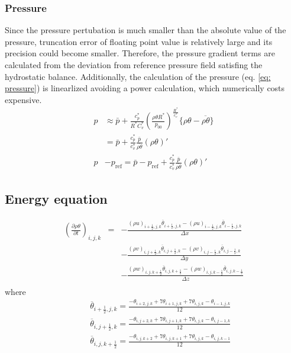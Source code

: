 \subsubsection{Pressure}
Since the pressure pertubation is much smaller than the absolute value of the pressure,
truncation error of floating point value is relatively large and its precision could become smaller.
Therefore, the pressure gradient terms are calculated from the deviation from reference pressure field satisfing the hydrostatic balance.
Additionally, the calculation of the pressure (eq. \ref{eq: pressure}) is linearlized avoiding a power calculation, which numerically costs expensive.
\begin{align}
  p
  &\approx \bar{p} + \frac{c_p^*}{R^* C_v^*}\left(\frac{\rho \theta R^*}{p_{00}}\right)^{\frac{R^*}{c_{v}^*}}  \{\rho \theta - \overline{\rho \theta}\} \nonumber \\
  &= \bar{p} + \frac{c_p^*}{c_v^*} \frac{\bar{p}}{\overline{\rho \theta}} (\rho \theta)' \\
  p &- p_\mathrm{ref}
  = \bar{p} - p_\mathrm{ref}
  + \frac{c_p^*}{c_v^*} \frac{\bar{p}}{\overline{\rho \theta}} (\rho \theta)'
\end{align}


\subsection{Energy equation}

\begin{eqnarray}
\left(\frac{\partial \rho \theta}{\partial t}\right)_{i,j,k}
&=& - \frac{(\rho u)_{i+\frac{1}{2},j,k} \overline{\theta}_{i+\frac{1}{2},j,k}
           -(\rho u)_{i-\frac{1}{2},j,k} \overline{\theta}_{i-\frac{1}{2},j,k}}
     {\Delta x}\nonumber\\
& &  - \frac{(\rho v)_{i,j+\frac{1}{2},k} \overline{\theta}_{i,j+\frac{1}{2},k}
           -(\rho v)_{i,j-\frac{1}{2},k} \overline{\theta}_{i,j-\frac{1}{2},k}}
     {\Delta y}\nonumber\\
& &  - \frac{(\rho w)_{i,j,k+\frac{1}{2}} \overline{\theta}_{i,j,k+\frac{1}{2}}
           -(\rho w)_{i,j,k-\frac{1}{2}} \overline{\theta}_{i,j,k-\frac{1}{2}}}
     {\Delta z}\nonumber\\
\end{eqnarray}
where
\begin{eqnarray}
&& \overline{\theta}_{i+\frac{1}{2},j,k} =
\frac{-\theta_{i+2,j,k}+7\theta_{i+1,j,k}+7\theta_{i,j,k}-\theta_{i-1,j,k}}{12}\\
&& \overline{\theta}_{i,j+\frac{1}{2},k} =
\frac{-\theta_{i,j+2,k}+7\theta_{i,j+1,k}+7\theta_{i,j,k}-\theta_{i,j-1,k}}{12}\\
&& \overline{\theta}_{i,j,k+\frac{1}{2}} =
\frac{-\theta_{i,j,k+2}+7\theta_{i,j,k+1}+7\theta_{i,j,k}-\theta_{i,j,k-1}}{12}
\end{eqnarray}

